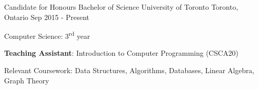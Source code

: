 \newcommand{\ts}{\textsuperscript}

\begin{cventries}
  \cventry
    {Candidate for Honours Bachelor of Science}
    {University of Toronto}
    {Toronto, Ontario}
    {Sep 2015 - Present}
    {
      \begin{cvitems}
        \item {Computer Science: 3\ts{rd} year}
        \item {\textbf{Teaching Assistant}: Introduction to Computer Programming (CSCA20)}
        \item Relevant Coursework: Data Structures, Algorithms, Databases, Linear Algebra, Graph Theory
      \end{cvitems}
    }

\end{cventries}
